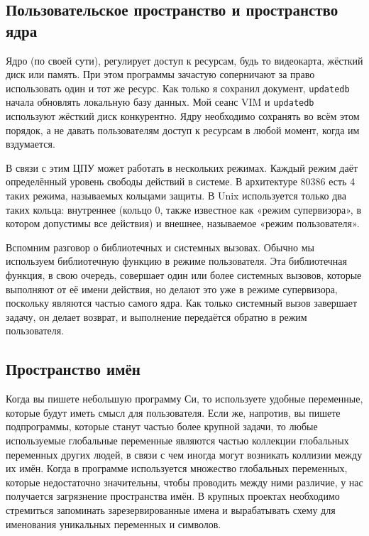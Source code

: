 \documentclass[10pt, oneside]{book}
\begin{document}
\subsection{Пользовательское пространство и пространство ядра}
\label{sec:user_kernl_space}
Ядро (по своей сути), регулирует доступ к ресурсам, будь то видеокарта, жёсткий диск или память. При этом программы зачастую соперничают за право использовать один и тот же ресурс. Как только я сохранил документ, \verb|updatedb| начала обновлять локальную базу данных. Мой сеанс VIM и \verb|updatedb|  используют жёсткий диск конкурентно. Ядру необходимо сохранять во всём этом порядок, а не давать пользователям доступ к ресурсам в любой момент, когда им вздумается.

В связи с этим ЦПУ может работать в нескольких режимах. Каждый режим даёт определённый уровень свободы действий в системе. В архитектуре 80386 есть 4 таких режима, называемых кольцами защиты. В Unix используется только два таких кольца: внутреннее (кольцо 0, также известное как «режим супервизора», в котором допустимы все действия) и внешнее, называемое «режим пользователя».

Вспомним разговор о библиотечных и системных вызовах. Обычно мы используем библиотечную функцию в режиме пользователя. Эта библиотечная функция, в свою
очередь, совершает один или более системных вызовов, которые выполняют от её имени действия, но делают это уже в режиме супервизора, поскольку являются частью самого ядра. Как только системный вызов завершает задачу, он делает возврат, и выполнение передаётся обратно в режим пользователя.

\subsection{Пространство имён}
\label{sec:namespace}
Когда вы пишете небольшую программу Си, то используете удобные переменные, которые будут иметь смысл для пользователя. Если же, напротив, вы пишете
подпрограммы, которые станут частью более крупной задачи, то любые используемые глобальные переменные являются частью коллекции глобальных переменных других людей, в связи с чем иногда могут возникать коллизии между их имён. Когда в программе используется множество глобальных переменных, которые недостаточно значительны, чтобы проводить между ними различие, у нас получается загрязнение пространства имён. В крупных проектах необходимо стремиться запоминать зарезервированные имена и вырабатывать схему для именования уникальных переменных и символов.
\end{document}
